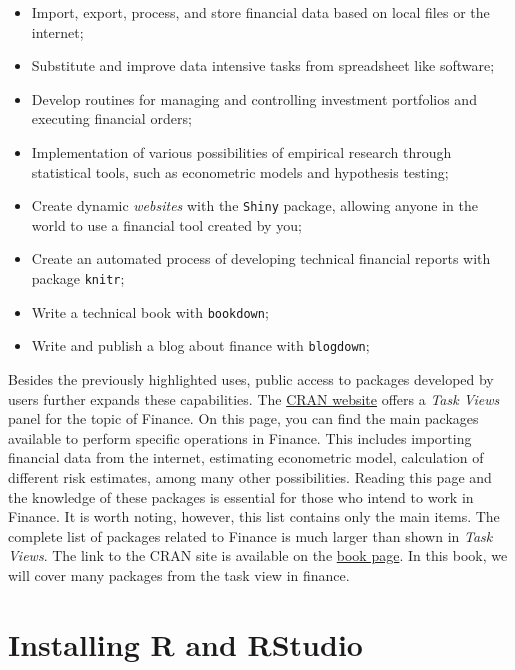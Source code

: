 \documentclass[11pt,]{book}
\begin{document}
\begin{itemize}
\item
  Import, export, process, and store financial data based on local files
  or the internet;
\item
  Substitute and improve data intensive tasks from spreadsheet like
  software;
\item
  Develop routines for managing and controlling investment portfolios
  and executing financial orders;
\item
  Implementation of various possibilities of empirical research through
  statistical tools, such as econometric models and hypothesis testing;
\item
  Create dynamic \emph{websites} with the \texttt{Shiny} package,
  allowing anyone in the world to use a financial tool created by you;
\item
  Create an automated process of developing technical financial reports
  with package \texttt{knitr}; 
\item
  Write a technical book with \texttt{bookdown}; 
\item
  Write and publish a blog about finance with \texttt{blogdown};
\end{itemize}

Besides the previously highlighted uses, public access to packages
developed by users further expands these capabilities. The
\href{https://cran.r-project.org/web/views/Finance.html}{CRAN website}
offers a \emph{Task Views} panel for the topic of Finance. On this page,
you can find the main packages available to perform specific operations
in Finance. This includes importing financial data from the internet,
estimating econometric model, calculation of different risk estimates,
among many other possibilities. Reading this page and the knowledge of
these packages is essential for those who intend to work in Finance. It
is worth noting, however, this list contains only the main items. The
complete list of packages related to Finance is much larger than shown
in \emph{Task Views}. The link to the CRAN site is available on the
\href{https://sites.google.com/view/pafdr/home}{book page}. In this
book, we will cover many packages from the task view in finance.

\section{Installing R and RStudio}\label{installing-r-and-rstudio}
\end{document}
